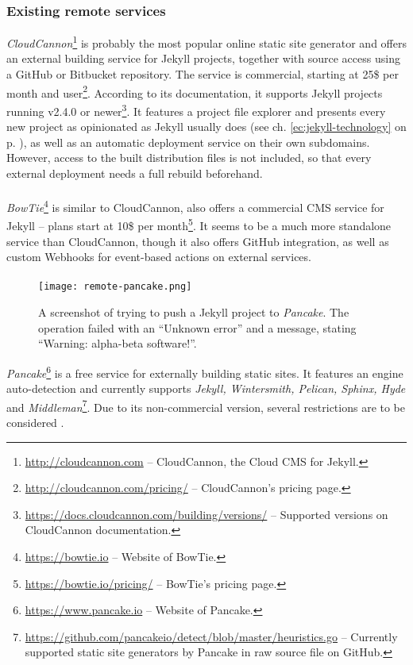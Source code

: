 \subsubsection{Existing remote services}
\emph{CloudCannon}\footnote{\url{http://cloudcannon.com} -- CloudCannon, the Cloud CMS for Jekyll.} is probably the most popular online static site generator and offers an external building service for Jekyll projects, together with source access using a GitHub or Bitbucket repository. The service is commercial, starting at 25\$ per month and user\footnote{\url{http://cloudcannon.com/pricing/} -- CloudCannon's pricing page.}. According to its documentation, it supports Jekyll projects running v2.4.0 or newer\footnote{\url{https://docs.cloudcannon.com/building/versions/} -- Supported versions on CloudCannon documentation.}. It features a project file explorer and presents every new project as opinionated as Jekyll usually does (see ch. \ref{ec:jekyll-technology} on p. \pageref{ec:jekyll-technology}), as well as an automatic deployment service on their own subdomains. However, access to the built distribution files is not included, so that every external deployment needs a full rebuild beforehand.

\paragraph{}
\emph{BowTie}\footnote{\url{https://bowtie.io} -- Website of BowTie.} is similar to CloudCannon, also offers a commercial CMS service for Jekyll -- plans start at 10\$ per month\footnote{\url{https://bowtie.io/pricing/} -- BowTie's pricing page.}. It seems to be a much more standalone service than CloudCannon, though it also offers GitHub integration, as well as custom Webhooks for event-based actions on external services.

\paragraph{}

\begin{figure} %
    \centering
    \texttt{[image: remote-pancake.png]}
    \caption{A screenshot of trying to push a Jekyll project to \emph{Pancake}. The operation failed with an ``Unknown error'' and a message, stating ``Warning: alpha-beta software!''.}
    \label{fig:remote-pancake}
\end{figure}
%
\emph{Pancake}\footnote{\url{https://www.pancake.io} -- Website of Pancake.} is a free service for externally building static sites. It features an engine auto-detection and currently supports \emph{Jekyll, Wintersmith, Pelican, Sphinx, Hyde} and \emph{Middleman}\footnote{\url{https://github.com/pancakeio/detect/blob/master/heuristics.go} -- Currently supported static site generators by Pancake in raw source file on GitHub.}. Due to its non-commercial version, several restrictions are to be considered \cite{PancakeGitProjects}.

